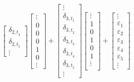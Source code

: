 \documentclass[11pt, english]{article}
\begin{document}
$${\begin{bmatrix}
			\delta_{{2,t}_4}\\
			\delta_{{2,t}_5}\\
                        \vdots
		\end{bmatrix}
                \begin{bmatrix}
			\vdots\\
                        0\\
                        0\\
                        0\\
                        1\\  
                        0\\  
                        \vdots
                \end{bmatrix}+
                \begin{bmatrix}
			\vdots\\
			\delta_{{3,t}_1}\\
			\delta_{{3,t}_2}\\
			\delta_{{3,t}_3}\\
			\delta_{{3,t}_4}\\
			\delta_{{3,t}_5}\\
                        \vdots
                \end{bmatrix}
                \begin{bmatrix}
			\vdots\\
                        1\\   
                        0\\
                        1\\
                        0\\  
                        1\\  
                        \vdots\\
                \end{bmatrix}+
                \begin{bmatrix}
			\vdots\\
                        \varepsilon_1\\
                        \varepsilon_2\\
                        \varepsilon_3\\
                        \varepsilon_4\\
                        \varepsilon_5\\
                        \vdots
                \end{bmatrix}
                }$$
\end{document}

